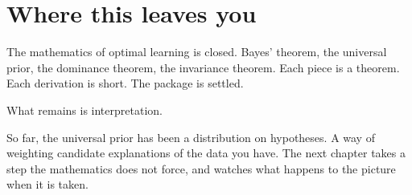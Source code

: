 \section*{Where this leaves you}

The mathematics of optimal learning is closed. Bayes' theorem, the universal prior, the dominance theorem, the invariance theorem. Each piece is a theorem. Each derivation is short. The package is settled.

What remains is interpretation.

So far, the universal prior has been a distribution on hypotheses. A way of weighting candidate explanations of the data you have. The next chapter takes a step the mathematics does not force, and watches what happens to the picture when it is taken.
